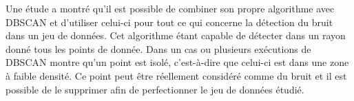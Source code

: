 \documentclass[memoire.tex]{subfiles}
\begin{document}
Une étude a montré qu’il est possible de combiner son propre algorithme avec DBSCAN et d’utiliser celui-ci pour tout ce qui concerne la détection du bruit dans un jeu de données. Cet algorithme étant capable de détecter dans un rayon donné tous les points de donnée. Dans un cas ou plusieurs exécutions de DBSCAN montre qu’un point est isolé, c’est-à-dire que celui-ci est dans une zone à faible densité. Ce point peut être réellement considéré comme du bruit et il est possible de le supprimer afin de perfectionner le jeu de données étudié.\cite{ref17}
\end{document}
